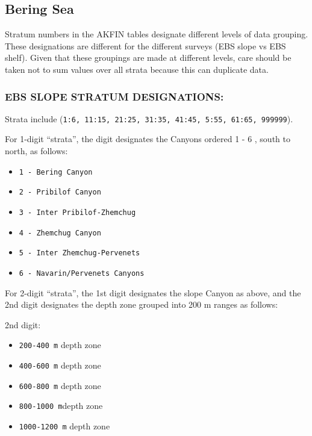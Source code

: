 \documentclass[
]{book}
\providecommand{\tightlist}{%
  \setlength{\itemsep}{0pt}\setlength{\parskip}{0pt}}
\begin{document}
\hypertarget{bering-sea}{%
\subsection{Bering Sea}\label{bering-sea}}

Stratum numbers in the AKFIN tables designate different levels of data grouping.
These designations are different for the different surveys (EBS slope vs EBS shelf).
Given that these groupings are made at different levels, care should be taken not to sum values over all strata because this can duplicate data.

\hypertarget{ebs-slope-stratum-designations}{%
\subsubsection{EBS SLOPE STRATUM DESIGNATIONS:}\label{ebs-slope-stratum-designations}}

Strata include (\texttt{1:6,\ 11:15,\ 21:25,\ 31:35,\ 41:45,\ 5:55,\ 61:65,\ 999999}).

For 1-digit ``strata'', the digit designates the Canyons ordered 1 - 6 , south to north, as follows:

\begin{itemize}
\tightlist
\item
  \texttt{1\ -\ Bering\ Canyon}
\item
  \texttt{2\ -\ Pribilof\ Canyon}
\item
  \texttt{3\ -\ Inter\ Pribilof-Zhemchug}
\item
  \texttt{4\ -\ Zhemchug\ Canyon}
\item
  \texttt{5\ -\ Inter\ Zhemchug-Pervenets}
\item
  \texttt{6\ -\ Navarin/Pervenets\ Canyons}
\end{itemize}

For 2-digit ``strata'', the 1st digit designates the slope Canyon as above, and the 2nd digit designates the depth zone grouped into 200 m ranges as follows:

2nd digit:

\begin{itemize}
\tightlist
\item
  \texttt{200-400\ m} depth zone
\item
  \texttt{400-600\ m} depth zone
\item
  \texttt{600-800\ m} depth zone
\item
  \texttt{800-1000\ m}depth zone
\item
  \texttt{1000-1200\ m} depth zone
\end{itemize}
\end{document}
